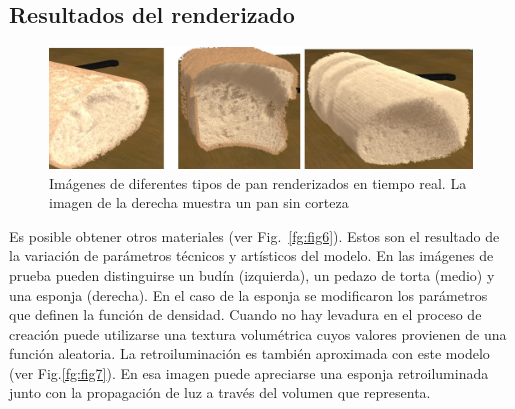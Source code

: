 %

\subsection{Resultados del renderizado}


\begin{figure}[htb!]
  \centerline{\includegraphics[width=13cm]{fig5}}
  \caption{Imágenes de diferentes tipos de pan renderizados en tiempo real. La imagen de la derecha muestra un pan sin corteza}
  \label{fg:fig5}
\end{figure}

Es posible obtener otros materiales (ver Fig.~\ref{fg:fig6}). Estos son el resultado de la variación de parámetros técnicos y artísticos del modelo. En las imágenes de prueba pueden distinguirse un budín (izquierda), un pedazo de torta (medio) y una esponja (derecha). En el caso de la esponja se modificaron los parámetros que definen la función de densidad. Cuando no hay levadura en el proceso de creación puede utilizarse una textura volumétrica cuyos valores provienen de una función aleatoria. La retroiluminación es también aproximada con este modelo (ver Fig.\ref{fg:fig7}). En esa imagen puede apreciarse una esponja retroiluminada junto con la propagación de luz a través del volumen que representa.

